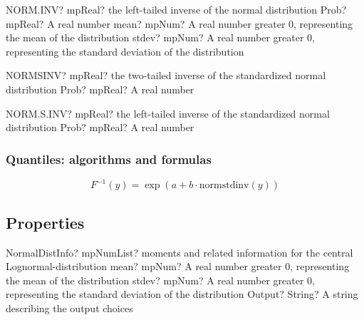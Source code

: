 \vspace{0.6cm}
\begin{mpFunctionsExtract}
	\mpWorksheetFunctionThreeNotImplemented
	{NORM.INV? mpReal? the left-tailed inverse of the normal distribution}
	{Prob? mpReal? A real number}
	{mean? mpNum? A real number greater 0, representing the mean of the distribution}
	{stdev? mpNum? A real number greater 0, representing the standard deviation of the distribution}
\end{mpFunctionsExtract}


\vspace{0.6cm}
\begin{mpFunctionsExtract}
	\mpWorksheetFunctionOneNotImplemented
	{NORMSINV? mpReal? the two-tailed inverse of the standardized normal distribution}
	{Prob? mpReal? A real number}
\end{mpFunctionsExtract}

\vspace{0.6cm}
\begin{mpFunctionsExtract}
	\mpWorksheetFunctionOneNotImplemented
	{NORM.S.INV? mpReal? the left-tailed inverse of the standardized normal distribution}
	{Prob? mpReal? A real number}
\end{mpFunctionsExtract}


\subsubsection{Quantiles: algorithms and formulas}

\begin{equation} 
	F^{-1}(y)= \exp(a+b \cdot \text{normstdinv}(y))
\end{equation}




\subsection{Properties}
\label{NormalDistributionProperties}


\begin{mpFunctionsExtract}
	\mpFunctionThreeNotImplemented
	{NormalDistInfo? mpNumList? moments and related information for the central Lognormal-distribution}
	{mean? mpNum? A real number greater 0, representing the mean of the distribution}
	{stdev? mpNum? A real number greater 0, representing the standard deviation of the distribution}
	{Output? String? A string describing the output choices}
\end{mpFunctionsExtract}

